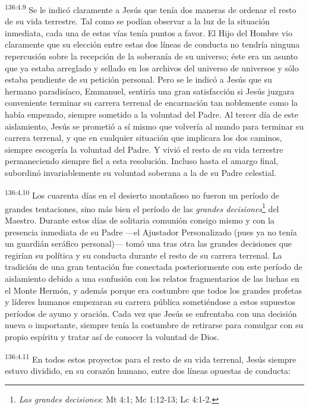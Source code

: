 \par 
\textsuperscript{136:4.9} Se le indicó claramente a Jesús que tenía dos maneras de ordenar el resto de su vida terrestre. Tal como se podían observar a la luz de la situación inmediata, cada una de estas vías tenía puntos a favor. El Hijo del Hombre vio claramente que su elección entre estas dos líneas de conducta no tendría ninguna repercusión sobre la recepción de la soberanía de su universo; éste era un asunto que ya estaba arreglado y sellado en los archivos del universo de universos y sólo estaba pendiente de su petición personal. Pero se le indicó a Jesús que su hermano paradisíaco, Emmanuel, sentiría una gran satisfacción si Jesús juzgara conveniente terminar su carrera terrenal de encarnación tan noblemente como la había empezado, siempre sometido a la voluntad del Padre. Al tercer día de este aislamiento, Jesús se prometió a sí mismo que volvería al mundo para terminar su carrera terrenal, y que en cualquier situación que implicara los dos caminos, siempre escogería la voluntad del Padre. Y vivió el resto de su vida terrestre permaneciendo siempre fiel a esta resolución. Incluso hasta el amargo final, subordinó invariablemente su voluntad soberana a la de su Padre celestial.

\par 
\textsuperscript{136:4.10} Los cuarenta días en el desierto montañoso no fueron un período de grandes tentaciones, sino más bien el período de las \textit{grandes decisiones}\footnote{\textit{Las grandes decisiones}: Mt 4:1; Mc 1:12-13; Lc 4:1-2.} del Maestro. Durante estos días de solitaria comunión consigo mismo y con la presencia inmediata de su Padre ---el Ajustador Personalizado (pues ya no tenía un guardián seráfico personal)--- tomó una tras otra las grandes decisiones que regirían su política y su conducta durante el resto de su carrera terrenal. La tradición de una gran tentación fue conectada posteriormente con este período de aislamiento debido a una confusión con los relatos fragmentarios de las luchas en el Monte Hermón, y además porque era costumbre que todos los grandes profetas y líderes humanos empezaran su carrera pública sometiéndose a estos supuestos períodos de ayuno y oración. Cada vez que Jesús se enfrentaba con una decisión nueva o importante, siempre tenía la costumbre de retirarse para comulgar con su propio espíritu y tratar así de conocer la voluntad de Dios.

\par 
\textsuperscript{136:4.11} En todos estos proyectos para el resto de su vida terrenal, Jesús siempre estuvo dividido, en su corazón humano, entre dos líneas opuestas de conducta:

